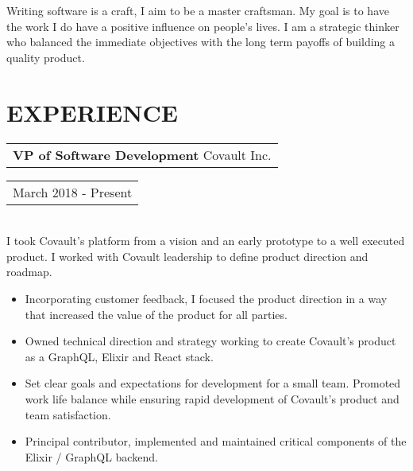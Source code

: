 \documentclass{resume}
\begin{document}

\address{\href{http://grahambaradoy.com}{grahambaradoy.com} \\ \href{https://www.github.com/baradoy}{github.com/baradoy}}
\address{ \href{mailto:graham@baradoy.ca}{graham@baradoy.ca} \\ 250-216-7112 }

\begin{resume}

\section{}
    Writing software is a craft, I aim to be a master craftsman.
    My goal is to have the work I do have a positive influence on people's lives.
    I am a strategic thinker who balanced the immediate objectives with the long term payoffs of building a quality product.

\section{EXPERIENCE}
    \vspace{+0.1in}
    \begin{tabular}[t]{@{}l}
        {\bf VP of Software Development} Covault Inc.
    \end{tabular}\vspace{+0.05in}
    \hfill
    \begin{tabular}[t]{l@{}}
        March 2018 - Present
    \end{tabular}\\
    I took Covault's platform from a vision and an early prototype to a well executed product. I worked with Covault leadership to define product direction and roadmap.
    \vspace{+0.05in}
    \begin{itemize} \itemsep -2pt
    \item Incorporating customer feedback, I focused the product direction in a way that increased the value of the product for all parties.
    \item Owned technical direction and strategy working to create Covault's product as a GraphQL, Elixir and React stack.
    \item Set clear goals and expectations for development for a small team. Promoted work life balance while ensuring rapid development of Covault's product and team satisfaction.
    \item Principal contributor, implemented and maintained critical components of the Elixir / GraphQL backend.
    \end{itemize}


\end{resume}
\end{document}
